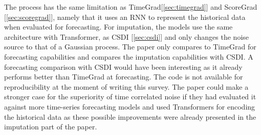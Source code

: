 The process has the same limitation as TimeGrad[\ref{sec:timegrad}] and ScoreGrad [\ref{sec:scoregrad}], namely that it uses an RNN to represent the historical data when evaluated for forecasting. For imputation, the models use the same architecture with Transformer, as CSDI [\ref{sec:csdi}] and only changes the noise source to that of a Gaussian process. The paper only compares to TimeGrad for forecasting capabilities and compares the imputation capabilities with CSDI. A forecasting comparison with CSDI would have been interesting as it already performs better than TimeGrad at forecasting. The code is not available for reproducibility at the moment of writing this survey. The paper could make a stronger case for the superiority of time correlated noise if they had evaluated it against more time-series forecasting models and used Transformers for encoding the historical data as these possible improvements were already presented in the imputation part of the paper.